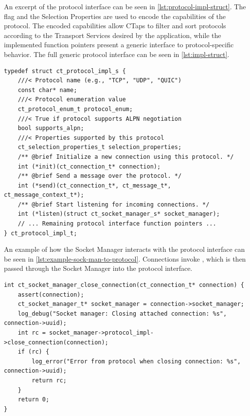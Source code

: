 An excerpt of the protocol interface can be seen in
\cref{lst:protocol-impl-struct}. The  flag
and the Selection Properties are used
to encode the capabilities of the protocol. The encoded capabilities 
allow CTaps to filter and sort protocols according to the
Transport Services desired by the application, while
the implemented function pointers present a generic
interface to protocol-specific behavior. The full generic
protocol interface can be seen in \cref{lst:impl-struct}.

\begin{listing}[htbp]
\begin{verbatim}
typedef struct ct_protocol_impl_s {
    ///< Protocol name (e.g., "TCP", "UDP", "QUIC")
    const char* name;
    ///< Protocol enumeration value
    ct_protocol_enum_t protocol_enum;
    ///< True if protocol supports ALPN negotiation
    bool supports_alpn;
    ///< Properties supported by this protocol
    ct_selection_properties_t selection_properties;
    /** @brief Initialize a new connection using this protocol. */
    int (*init)(ct_connection_t* connection);
    /** @brief Send a message over the protocol. */
    int (*send)(ct_connection_t*, ct_message_t*, ct_message_context_t*);
    /** @brief Start listening for incoming connections. */
    int (*listen)(struct ct_socket_manager_s* socket_manager);
    // ... Remaining protocol interface function pointers ...
} ct_protocol_impl_t;
\end{verbatim}
\caption[Protocol interface excerpt]{Excerpt from the protocol interface.}
\label{lst:protocol-impl-struct}
\end{listing}

An example of how the Socket Manager interacts with the protocol interface
can be seen in \cref{lst:example-sock-man-to-protocol}. Connections
invoke , which is then passed
through the Socket Manager into the protocol interface.

\begin{listing}[htbp]
\begin{verbatim}
int ct_socket_manager_close_connection(ct_connection_t* connection) {
    assert(connection);
    ct_socket_manager_t* socket_manager = connection->socket_manager;
    log_debug("Socket manager: Closing attached connection: %s", connection->uuid);
    int rc = socket_manager->protocol_impl->close_connection(connection);
    if (rc) {
        log_error("Error from protocol when closing connection: %s", connection->uuid);
        return rc;
    }
    return 0;
}
\end{verbatim}
\caption[Socket Manager generic protocol API usage]
{
    Example of the access pattern between the Socket Manager and the protocol
    interface. The Connection is not considered to be closed until the
     callback is invoked by the protocol interface.
}
\label{lst:example-sock-man-to-protocol}
\end{listing}



